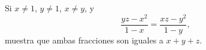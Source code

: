 Si $x\neq1$, $y\neq1$, $x\neq y$, y
\[ \frac{yz-x^{2}}{1-x}=\frac{xz-y^{2}}{1-y},\]
muestra que ambas fracciones son iguales a $x+y+z$.
